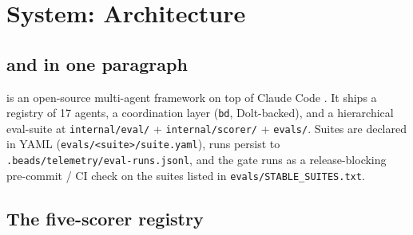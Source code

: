 \section{System: \blackrim \evalsuite Architecture}
\label{sec:system}


\subsection{\blackrim and \evalsuite in one paragraph}

\blackrim \cite{german2026blackrim} is an open-source multi-agent
framework on top of Claude Code \cite{anthropic2024claudecode}. It
ships a registry of 17 agents, a coordination layer (\texttt{bd},
Dolt-backed), and a hierarchical eval-suite at
\texttt{internal/eval/} + \texttt{internal/scorer/} + \texttt{evals/}.
Suites are declared in YAML (\texttt{evals/<suite>/suite.yaml}),
runs persist to \texttt{.beads/telemetry/eval-runs.jsonl}, and the
gate runs as a release-blocking pre-commit / CI check on the suites
listed in \texttt{evals/STABLE\_SUITES.txt}.

\subsection{The five-scorer registry}


